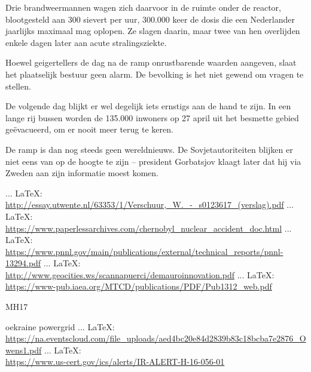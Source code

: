 \begin{thebibliography}{99}
{{Drie brandweermannen wagen zich daarvoor in de ruimte onder de reactor, blootgesteld aan 300 sievert per uur, 300.000 keer de dosis die een Nederlander jaarlijks maximaal mag oplopen. Ze slagen daarin, maar twee van hen overlijden enkele dagen later aan acute stralingsziekte.

Hoewel geigertellers de dag na de ramp onrustbarende waarden aangeven, slaat het plaatselijk bestuur geen alarm. De bevolking is het niet gewend om vragen te stellen.

De volgende dag blijkt er wel degelijk iets ernstigs aan de hand te zijn. In een lange rij bussen worden de 135.000 inwoners op 27 april uit het besmette gebied geëvacueerd, om er nooit meer terug te keren.

De ramp is dan nog steeds geen wereldnieuws. De Sovjetautoriteiten blijken er niet eens van op de hoogte te zijn – president Gorbatsjov klaagt later dat hij via Zweden aan zijn informatie moest komen.


 ... \LaTeX:\\ \url{http://essay.utwente.nl/63353/1/Verschuur,_W._-_s0123617_(verslag).pdf}
 ... \LaTeX:\\ \url{https://www.paperlessarchives.com/chernobyl_nuclear_accident_doc.html}
 ... \LaTeX:\\ \url{https://www.pnnl.gov/main/publications/external/technical_reports/pnnl-13294.pdf}
 ... \LaTeX:\\ \url{http://www.geocities.ws/scannapuerci/demauroinnovation.pdf}
 ... \LaTeX:\\ \url{https://www-pub.iaea.org/MTCD/publications/PDF/Pub1312_web.pdf}




MH17




oekraine powergrid
 ... \LaTeX:\\ \url{https://na.eventscloud.com/file_uploads/aed4bc20e84d2839b83c18bcba7e2876_Owens1.pdf}
 ... \LaTeX:\\ \url{https://www.us-cert.gov/ics/alerts/IR-ALERT-H-16-056-01}

}}
\end{thebibliography}
